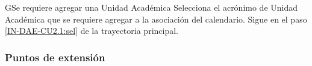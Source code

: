 
\begin{UCtrayectoriaA}{G}{Se requiere agregar una Unidad Académica}
	\UCpaso [\UCactor]  Selecciona el acrónimo de Unidad Académica que se requiere agregar a la asociación del calendario. 
	\UCpaso Sigue en el paso \ref{IN-DAE-CU2.1:sel}  de la trayectoria principal.
\end{UCtrayectoriaA}


\subsubsection{Puntos de extensión}

